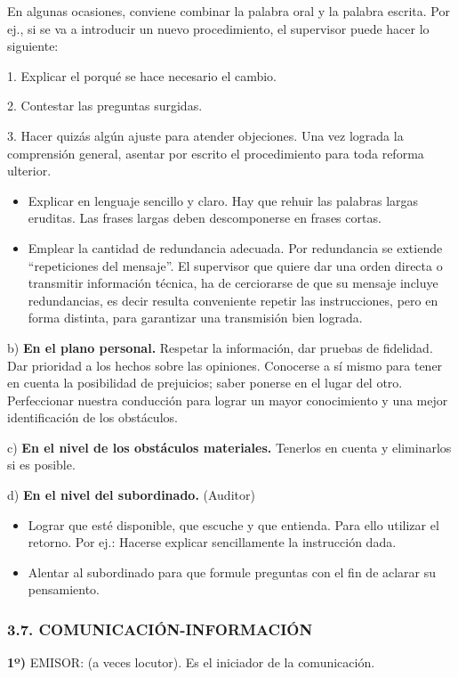 
En algunas ocasiones, conviene combinar la palabra oral y la palabra escrita. Por ej., si se va a introducir un nuevo procedimiento, el supervisor puede hacer lo siguiente:

1. Explicar el porqué se hace necesario el cambio.

2. Contestar las preguntas surgidas.

3. Hacer quizás algún ajuste para atender objeciones. Una vez lograda la comprensión general, asentar por escrito el procedimiento para toda reforma ulterior.

\begin{itemize}
  \item Explicar en lenguaje sencillo y claro. Hay que rehuir las palabras largas eruditas. Las frases largas deben descomponerse en frases cortas.
  \item Emplear la cantidad de redundancia adecuada. Por redundancia se extiende “repeticiones del mensaje”. El supervisor que quiere dar una orden directa o transmitir información técnica, ha de cerciorarse de que su mensaje incluye redundancias, es decir resulta conveniente repetir las instrucciones, pero en forma distinta, para garantizar una transmisión bien lograda.
\end{itemize}
b) \textbf{En el plano personal. }Respetar la información, dar pruebas de fidelidad. Dar prioridad a los hechos sobre las opiniones. Conocerse a sí mismo para tener en cuenta la posibilidad de prejuicios; saber ponerse en el lugar del otro. Perfeccionar nuestra conducción para lograr un mayor conocimiento y una mejor identificación de los obstáculos.

c) \textbf{En el nivel de los obstáculos materiales. }Tenerlos en cuenta y eliminarlos si es posible.

d) \textbf{En el nivel del subordinado. }(Auditor)

\begin{itemize}
  \item Lograr que esté disponible, que escuche y que entienda. Para ello utilizar el retorno. Por ej.: Hacerse explicar sencillamente la instrucción dada.
  \item Alentar al subordinado para que formule preguntas con el fin de aclarar su pensamiento.
\end{itemize}
\subsubsection*{3.7. COMUNICACIÓN-INFORMACIÓN}
\textbf{1º) }EMISOR: (a veces locutor). Es el iniciador de la comunicación.


